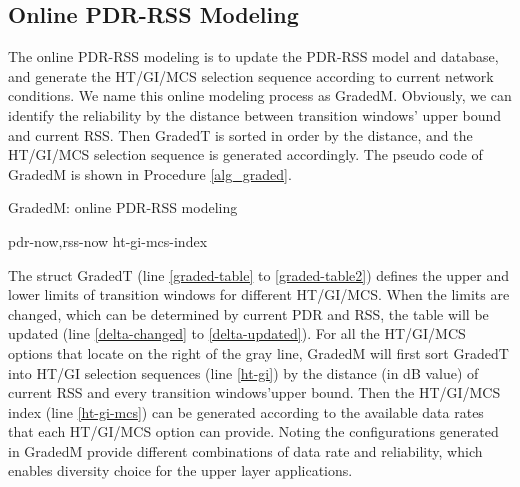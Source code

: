 \documentclass[journal,onecolumn,12pt]{IEEEtran}
\begin{document}
\subsection{Online PDR-RSS Modeling}
The online PDR-RSS modeling is to update the PDR-RSS model and database, and generate the HT/GI/MCS selection sequence according to current network conditions. We name this online modeling process as GradedM. Obviously, we can identify the reliability by the distance between transition windows' upper bound and current RSS. Then GradedT is sorted in order by the distance, and the HT/GI/MCS selection sequence is generated accordingly. The pseudo code of GradedM is shown in Procedure \ref{alg_graded}.
\begin{algorithm}[!t]
\renewcommand{\algorithmicrequire}{\textbf{Input:}}
\renewcommand{\algorithmicensure}{\textbf{Output:}}
\caption{GradedM: online PDR-RSS modeling}
\label{alg_graded}
\begin{algorithmic}[1]
\Require pdr-now,rss-now
\Ensure  ht-gi-mcs-index
 \label{delta-changed}
\EndIf \label{delta-updated}
 \label{ht-gi}
 \label{ht-gi-mcs}
\State {}
\end{algorithmic}
\end{algorithm}

The struct GradedT (line \ref{graded-table} to \ref{graded-table2}) defines the upper and lower limits of transition windows for different HT/GI/MCS. When the limits are changed, which can be determined by current PDR and RSS, the table will be updated (line \ref{delta-changed} to \ref{delta-updated}). For all the HT/GI/MCS options that locate on the right of the gray line, GradedM will first sort GradedT into HT/GI selection sequences (line \ref{ht-gi}) by the distance (in dB value) of current RSS and every transition windows\rq upper bound. Then the HT/GI/MCS index (line \ref{ht-gi-mcs}) can be generated according to the available data rates that each HT/GI/MCS option can provide. Noting the configurations generated in GradedM provide different combinations of data rate and reliability, which enables diversity choice for the upper layer applications.
\end{document}
